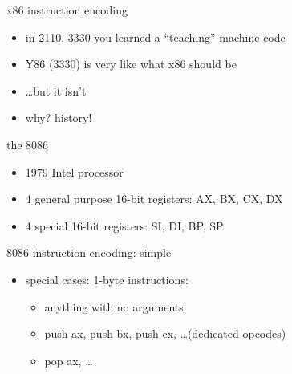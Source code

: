 \begin{frame}{x86 instruction encoding}
\begin{itemize}
    \item in 2110, 3330 you learned a ``teaching'' machine code
    \item Y86 (3330) is very like what x86 should be
    \item \ldots but it isn't
    \item why? history!
\end{itemize}
\end{frame}

\begin{frame}{the 8086}
\begin{itemize}
    \item 1979 Intel processor
    \item 4 general purpose 16-bit registers: AX, BX, CX, DX
    \item 4 special 16-bit registers: SI, DI, BP, SP
\end{itemize}
\end{frame}

\begin{frame}{8086 instruction encoding: simple}
\begin{itemize}
    \item special cases: 1-byte instructions:
    \begin{itemize}
    \item anything with no arguments
    \item push ax, push bx, push cx, \ldots (dedicated opcodes)
    \item pop ax, \ldots
    \end{itemize}
\end{itemize}
\end{frame}

